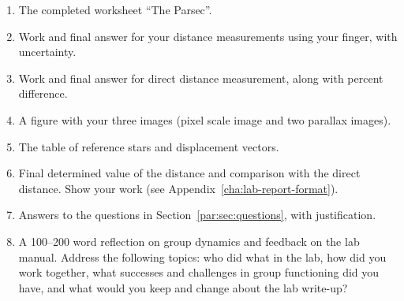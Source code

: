 \begin{enumerate}
	\item The completed worksheet ``The Parsec''.
	\item Work and final answer for your distance measurements using your finger, with uncertainty.
	\item Work and final answer for direct distance measurement, along with percent difference.
	\item A figure with your three images (pixel scale image and two parallax images).
	\item The table of reference stars and displacement vectors.
	\item Final determined value of the distance and comparison with the direct distance. Show your work (see Appendix~\ref{cha:lab-report-format}).
	\item Answers to the questions in Section~\ref{par:sec:questions}, with justification.
	\item A 100--200 word reflection on group dynamics and feedback on the lab manual. Address the following topics: who did what in the lab, how did you work together, what successes and challenges in group functioning did you have, and what would you keep and change about the lab write-up?
\end{enumerate}